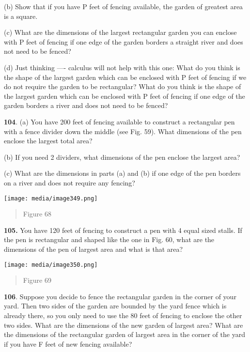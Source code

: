 (b) Show that if you have P feet of fencing available, the garden of
greatest area is a square.

(c) What are the dimensions of the largest rectangular garden you can
enclose with P feet of fencing if one edge of the garden borders a
straight river and does not need to be fenced?

(d) Just thinking ---- calculus will not help with this one: What do you
think is the shape of the largest garden which can be enclosed with P
feet of fencing if we do not require the garden to be rectangular? What
do you think is the shape of the largest garden which can be enclosed
with P feet of fencing if one edge of the garden borders a river and
does not need to be fenced?

\textbf{104}. (a) You have 200 feet of fencing available to construct a
rectangular pen with a fence divider down the middle (see Fig. 59). What
dimensions of the pen enclose the largest total area?

(b) If you need 2 dividers, what dimensions of the pen enclose the
largest area?

(c) What are the dimensions in parts (a) and (b) if one edge of the pen
borders on a river and does not require any fencing?

\texttt{[image: media/image349.png]}

\begin{quote}
Figure 68
\end{quote}

\textbf{105.} You have 120 feet of fencing to construct a pen with 4
equal sized stalls. If the pen is rectangular and shaped like the one in
Fig. 60, what are the dimensions of the pen of largest area and what is
that area?

\texttt{[image: media/image350.png]}

\begin{quote}
Figure 69
\end{quote}

\textbf{106}. Suppose you decide to fence the rectangular garden in the
corner of your yard. Then two sides of the garden are bounded by the
yard fence which is already there, so you only need to use the 80 feet
of fencing to enclose the other two sides. What are the dimensions of
the new garden of largest area? What are the dimensions of the
rectangular garden of largest area in the corner of the yard if you have
F feet of new fencing available?

